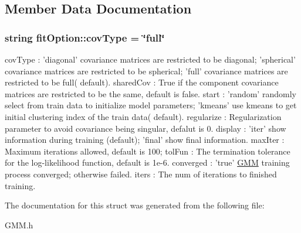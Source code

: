 \subsection{Member Data Documentation}
\hypertarget{structfit_option_ae1d880f6fcd26e15f07d50c77c5cceea}{
\subsubsection[{cov\+Type}]{\setlength{\rightskip}{0pt plus 5cm}string fit\+Option\+::cov\+Type = \char`\"{}full\char`\"{}}}\label{structfit_option_ae1d880f6fcd26e15f07d50c77c5cceea}
cov\+Type \+: 'diagonal' covariance matrices are restricted to be diagonal; 'spherical' covariance matrices are restricted to be spherical; 'full' covariance matrices are restricted to be full( default). shared\+Cov \+: True if the component covariance matrices are restricted to be the same, default is false. start \+: 'random' randomly select from train data to initialize model parameters; 'kmeans' use kmeans to get initial clustering index of the train data( default). regularize \+: Regularization parameter to avoid covariance being singular, defalut is 0. display \+: 'iter' show information during training (default); 'final' show final information. max\+Iter \+: Maximum iterations allowed, default is 100; tol\+Fun \+: The termination tolerance for the log-\/likelihood function, default is 1e-\/6. converged \+: 'true' \hyperlink{class_g_m_m}{G\+M\+M} training process converged; otherwise failed. iters \+: The num of iterations to finished training. 

The documentation for this struct was generated from the following file\+:\begin{DoxyCompactItemize}
\item 
G\+M\+M.\+h\end{DoxyCompactItemize}
